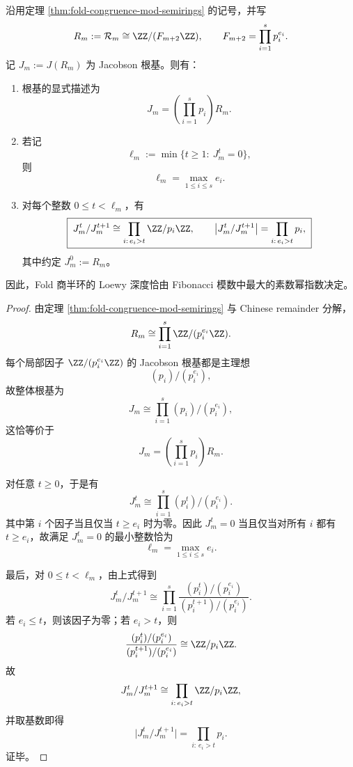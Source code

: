 \begin{theorem}\label{thm:xi-fold-congruence-semiring-jacobson-loewy-profile}
沿用定理 \ref{thm:fold-congruence-mod-semirings} 的记号，并写
\[
R_m:=\mathcal R_m\cong \ZZ/(F_{m+2}\ZZ),
\qquad
F_{m+2}=\prod_{i=1}^{s}p_i^{e_i}.
\]
记 \(J_m:=J(R_m)\) 为 Jacobson 根基。则有：
\begin{enumerate}
  \item 根基的显式描述为
  \[
  \boxed{\;
  J_m=\left(\prod_{i=1}^{s}p_i\right)R_m.\;}
  \]
  \item 若记
  \[
  \ell_m:=\min\{t\ge 1:\ J_m^t=0\},
  \]
  则
  \[
  \boxed{\;
  \ell_m=\max_{1\le i\le s}e_i.\;}
  \]
  \item 对每个整数 \(0\le t<\ell_m\)，有
  \[
  \boxed{\;
  J_m^t/J_m^{t+1}\cong \prod_{i:\,e_i>t}\ZZ/p_i\ZZ,\qquad
  \bigl|J_m^t/J_m^{t+1}\bigr|=\prod_{i:\,e_i>t}p_i,\;}
  \]
  其中约定 \(J_m^0:=R_m\)。
\end{enumerate}
因此，Fold 商半环的 Loewy 深度恰由 Fibonacci 模数中最大的素数幂指数决定。
\end{theorem}
\begin{proof}
由定理 \ref{thm:fold-congruence-mod-semirings} 与 Chinese remainder 分解，
\[
R_m\cong \prod_{i=1}^{s}\ZZ/(p_i^{e_i}\ZZ).
\]
每个局部因子 \(\ZZ/(p_i^{e_i}\ZZ)\) 的 Jacobson 根基都是主理想
\[
(p_i)/(p_i^{e_i}),
\]
故整体根基为
\[
J_m\cong \prod_{i=1}^{s}(p_i)/(p_i^{e_i}),
\]
这恰等价于
\[
J_m=\left(\prod_{i=1}^{s}p_i\right)R_m.
\]

对任意 \(t\ge 0\)，于是有
\[
J_m^t\cong \prod_{i=1}^{s}(p_i^t)/(p_i^{e_i}).
\]
其中第 \(i\) 个因子当且仅当 \(t\ge e_i\) 时为零。因此 \(J_m^t=0\) 当且仅当对所有 \(i\) 都有 \(t\ge e_i\)，故满足 \(J_m^t=0\) 的最小整数恰为
\[
\ell_m=\max_{1\le i\le s}e_i.
\]

最后，对 \(0\le t<\ell_m\)，由上式得到
\[
J_m^t/J_m^{t+1}
\cong
\prod_{i=1}^{s}
\frac{(p_i^t)/(p_i^{e_i})}{(p_i^{t+1})/(p_i^{e_i})}.
\]
若 \(e_i\le t\)，则该因子为零；若 \(e_i>t\)，则
\[
\frac{(p_i^t)/(p_i^{e_i})}{(p_i^{t+1})/(p_i^{e_i})}
\cong
\ZZ/p_i\ZZ.
\]
故
\[
J_m^t/J_m^{t+1}\cong \prod_{i:\,e_i>t}\ZZ/p_i\ZZ,
\]
并取基数即得
\[
\bigl|J_m^t/J_m^{t+1}\bigr|=\prod_{i:\,e_i>t}p_i.
\]
证毕。
\end{proof}




